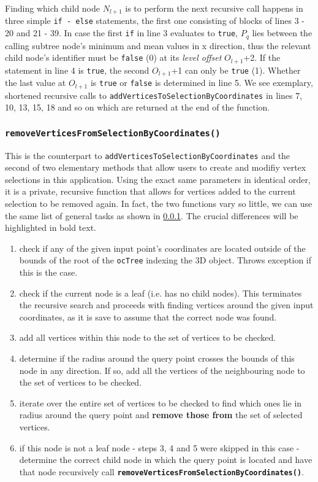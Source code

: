 Finding which child node $N_{l+1}$ is to perform the next recursive call happens in three simple \texttt{if - else} statements, the first one consisting of blocks of lines 3 - 20 and 21 - 39. In case the first \texttt{if} in line 3 evaluates to \texttt{true}, $P_q$ lies between the calling subtree node's minimum and mean values in x direction, thus the relevant child node's identifier must be \texttt{false} (0) at its \textit{level offset} $O_{l+1}$+2. If the statement in line 4 is \texttt{true}, the second $O_{l+1}$+1 can only be \texttt{true} (1). Whether the last value at $O_{l+1}$ is \texttt{true} or \texttt{false} is determined in line 5. We see exemplary, shortened recursive calls to \texttt{addVerticesToSelectionByCoordinates} in lines 7, 10, 13, 15, 18 and so on which are returned at the end of the function.

	\subsubsection{\texttt{removeVerticesFromSelectionByCoordinates()}}
	\label{sec:removeVerticesFromSelectionByCoordinates()}

This is the counterpart to \texttt{addVerticesToSelectionByCoordinates} and the second of two elementary methods that allow users to create and modifiy vertex selections in this application. Using the exact same parameters in identical order, it is a private, recursive function that allows for vertices added to the current selection to be removed again. In fact, the two functions vary so little, we can use the same list of general tasks as shown in \ref{sec:removeVerticesFromSelectionByCoordinates()}. The crucial differences will be highlighted in bold text.

\begin{enumerate}
	\item check if any of the given input point's coordinates are located outside of the bounds of the root of the \texttt{ocTree} indexing the 3D object. Throws exception if this is the case.
	\item check if the current node is a leaf (i.e. has no child nodes). This terminates the recursive search and proceeds with finding vertices around the given input coordinates, as it is save to assume that the correct node was found.
	\item add all vertices within this node to the set of vertices to be checked.
	\item determine if the radius around the query point crosses the bounds of this node in any direction. If so, add all the vertices of the neighbouring node to the set of vertices to be checked.
	\item iterate over the entire set of vertices to be checked to find which ones lie in radius around the query point and \textbf{remove those from} the set of selected vertices.
	\item if this node is not a leaf node - steps 3, 4 and 5 were skipped in this case - determine the correct child node in which the query point is located and have that node recursively call \textbf{\texttt{removeVerticesFromSelectionByCoordinates()}}.
\end{enumerate}

